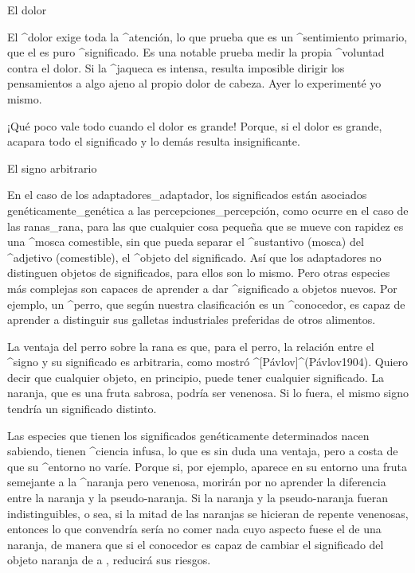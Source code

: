 \Section El dolor

El ^{dolor} exige toda la ^{atención}, lo que prueba que es un
^{sentimiento} primario, que el  es puro ^{significado}.
Es una notable prueba medir la propia ^{voluntad} contra el dolor. Si la
^{jaqueca} es intensa, resulta imposible dirigir los pensamientos a algo
ajeno al propio dolor de cabeza.
 Ayer lo experimenté yo mismo. %

¡Qué poco vale todo cuando el dolor es grande! Porque, si el dolor es
grande, acapara todo el significado y lo demás resulta insignificante.


\Section El signo arbitrario

En el caso de los adaptadores_{adaptador}, los significados están
asociados genéticamente_{genética} a las percepciones_{percepción}, como
ocurre en el caso de las ranas_{rana}, para las que cualquier cosa
pequeña que se mueve con rapidez es una ^{mosca} comestible, sin que
pueda separar el ^{sustantivo} (mosca) del ^{adjetivo} (comestible), el
^{objeto} del significado. Así que los adaptadores no distinguen objetos
de significados, para ellos son lo mismo. Pero otras especies más
complejas son capaces de aprender a dar ^{significado} a objetos nuevos.
Por ejemplo, un ^{perro}, que según nuestra clasificación es un
^{conocedor}, es capaz de aprender a distinguir sus galletas
industriales preferidas de otros alimentos.

La ventaja del perro sobre la rana es que, para el perro, la relación
entre el ^{signo} y su significado es arbitraria, como mostró
^[Pávlov]^(Pávlov1904). Quiero decir que cualquier objeto, en principio,
puede tener cualquier significado. La naranja, que es una fruta sabrosa,
podría ser venenosa. Si lo fuera, el mismo signo tendría un significado
distinto.

Las especies que tienen los significados genéticamente determinados
nacen sabiendo, tienen ^{ciencia infusa}, lo que es sin duda una
ventaja, pero a costa de que su ^{entorno} no varíe. Porque si, por
ejemplo, aparece en su entorno una fruta semejante a la ^{naranja} pero
venenosa, morirán por no aprender la diferencia entre la naranja y la
pseudo-naranja. Si la naranja y la pseudo-naranja fueran
indistinguibles, o sea, si la mitad de las naranjas se hicieran de
repente venenosas, entonces lo que convendría sería no comer nada cuyo
aspecto fuese el de una naranja, de manera que si el conocedor es capaz
de cambiar el significado del objeto naranja de
 a , reducirá sus riesgos.

